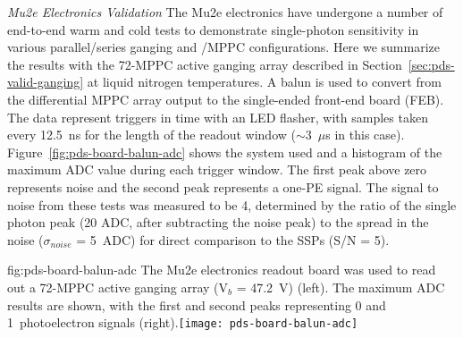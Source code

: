 

\textit{Mu2e Electronics Validation}
The Mu2e electronics have undergone a number of end-to-end warm and cold tests to demonstrate single-photon sensitivity in various parallel/series ganging and /MPPC configurations. Here we summarize the results with the 72-MPPC active ganging array described in Section~\ref{sec:pds-valid-ganging}
at liquid nitrogen temperatures. 
A balun is used to convert from the differential MPPC array output to the single-ended front-end board (FEB). The data represent triggers in time with an LED flasher, with samples taken every 12.5~ns for the length of the readout window ($\sim$3~$\mu$s in this case). Figure~\ref{fig:pds-board-balun-adc} shows the system used and a histogram of the maximum ADC value during each trigger window. The first peak above zero represents noise and the second peak represents a one-PE signal. The signal to noise from these tests was measured to be 4, determined by the ratio of the single photon peak (20 ADC, after subtracting the noise peak) to the spread in the noise ($\sigma_{noise}$ = 5~ADC) for direct comparison to the SSPs (S/N = 5).

\begin{dunefigure}
{fig:pds-board-balun-adc}
{The Mu2e electronics readout board was used to read out a 72-MPPC active ganging array (V$_b$ = \SI{47.2}{V}) (left). The maximum ADC results are shown, with the first and second peaks representing 0 and 1~photoelectron signals (right).}\texttt{[image: pds-board-balun-adc]} 
\vspace{-7.0cm}
\end{dunefigure}


